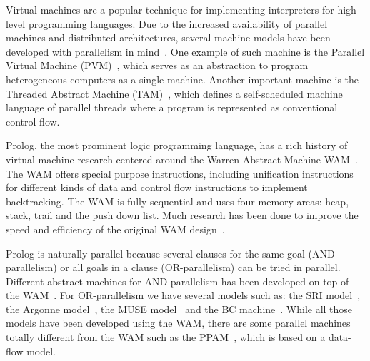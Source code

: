 Virtual machines are a popular technique for implementing interpreters for high level programming languages.
Due to the increased availability of parallel machines and distributed architectures, several machine
models have been developed with parallelism in mind~\cite{Kara:1997:AMM:265274}.
One example of such machine is the Parallel Virtual Machine (PVM)~\cite{Sunderam90pvm:a}, which serves as an abstraction
to program heterogeneous computers as a single machine. Another important machine is the Threaded Abstract Machine (TAM)~\cite{CullerGSvE93,goldstein-tr94},
which defines a self-scheduled machine language of parallel threads where a program is represented as conventional control flow.

Prolog, the most prominent logic programming language, has a rich history of virtual machine research centered
around the Warren Abstract Machine WAM~\cite{AICPub641:1983}. The WAM offers special purpose instructions, including
unification instructions for different kinds of data and control flow instructions to implement backtracking.
The WAM is fully sequential and uses four memory areas: heap, stack, trail and the push down list.
Much research has been done to improve the speed and efficiency of the original WAM design~\cite{Costa07demand-drivenindexing,167005,Turk-Logic:1986fk}.

Prolog is naturally parallel because several clauses for the same goal (AND-parallelism) or all goals in a clause (OR-parallelism) can be tried
in parallel. Different abstract machines for AND-parallelism has been developed on top of the WAM~\cite{Hermenegildo:1986:AMB:913061,Lin:1988:AEL:900478}.
For OR-parallelism we have several models such as: the SRI model~\cite{Warren:1987:OEM:67683.67699},
the Argonne model~\cite{ButlerDLOOS88}, the MUSE model~\cite{Ali:1990fk} and the BC machine~\cite{Ali88}. While all those models have been
developed using the WAM, there are some parallel machines totally different from the WAM such as the PPAM~\cite{Kacsuk:1990:EMP:533578},
which is based on a data-flow model.
